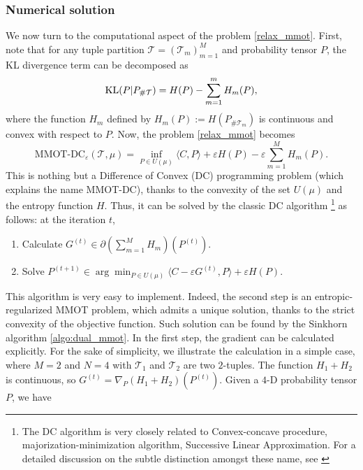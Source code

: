 \subsubsection*{Numerical solution} \label{sec:algo}
We now turn to the computational aspect of the problem \ref{relax_mmot}. First, note that for any tuple partition
$\mathcal T = (\mathcal T_m)_{m=1}^M$ and probability tensor $P$, the KL divergence term can be decomposed as
\begin{equation}
  \text{KL}(P \vert P_{\# \mathcal T}) = H(P) - \sum_{m=1}^m H_m(P),
\end{equation}
where the function $H_m$ defined by $H_m(P) := H(P_{\# \mathcal T_m})$ is continuous and convex with respect to $P$.
Now, the problem \ref{relax_mmot} becomes
\begin{equation} \label{relax}
  \text{MMOT-DC}_{\varepsilon}(\mathcal T, \mu) = \inf_{P \in U(\mu)}
  \langle C, P \rangle + \varepsilon H(P) - \varepsilon \sum_{m=1}^M H_m(P).
\end{equation}
This is nothing but a Difference of Convex (DC) programming problem (which explains the name MMOT-DC),
thanks to the convexity of the set $U(\mu)$ and the entropy function $H$. Thus, it can be solved
by the classic DC algorithm
\footnote{The DC algorithm is very closely related to Convex-concave procedure, majorization-minimization algorithm, Successive Linear
Approximation. For a detailed discussion on the subtle distinction amongst these name, see
\citep{}} \citep{Tao86,Tao97} as follows: at the iteration $t$,
\begin{enumerate}
  \item Calculate $G^{(t)} \in \partial(\sum_{m=1}^M H_m)(P^{(t)})$.
  \item Solve $P^{(t+1)} \in \arg\min_{P \in U(\mu)} \langle C -
  \varepsilon G^{(t)}, P \rangle + \varepsilon H(P)$.
\end{enumerate}
This algorithm is very easy to implement. Indeed, the second step is an entropic-regularized MMOT problem, which admits a unique
solution, thanks to the strict convexity of the objective function. Such solution can be found by the Sinkhorn algorithm
\ref{algo:dual_mmot}. In the first step, the gradient can be calculated explicitly.
For the sake of simplicity, we illustrate the calculation in a simple case, where $M=2$ and $N=4$ with
$\mathcal T_1$ and $\mathcal T_2$ are two $2$-tuples. The function $H_1 + H_2$ is continuous, so
$G^{(t)} = \nabla_P (H_1 + H_2)(P^{(t)})$. Given a $4$-D probability tensor $P$, we have
